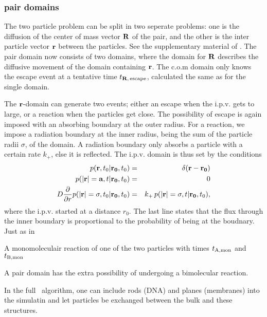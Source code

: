 \subsubsection{pair domains}
The two particle problem can be split in two seperate problems: one is the diffusion of the center of mass vector ${\bf R}$ of the pair, and the other is the inter particle vector ${\bf r}$ between the particles. See the supplementary material of \cite{Takahashi2010}. The pair domain now consists of two domains, where the domain for ${\bf R}$ describes the diffusive movement of the domain containing ${\bf r}$. The c.o.m domain only knows the escape event at a tentative time $t_{{\bf R},\,{\rm escape}}$, calculated the same as for the single domain. 

The ${\bf r}$-domain can generate two events; either an escape when the i.p.v. gets to large, or a reaction when the particles get close. The possibility of escape is again imposed with an absorbing boundary at the outer radius. For a reaction, we impose a radiation boundary at the inner radius, being the sum of the particle radii $\sigma$, of the domain. A radiation boundary only absorbs a particle with a certain rate $k_+$, else it is reflected. The i.p.v. domain is thus set by the conditions
\setlength{\jot}{10pt}
\begin{eqnarray}
 p({\bf r}, t_0|{\bf r_0},t_0) & = & \delta(\mathbf{r - r_0}) \\
 p({\bf |r|=a}, t|{\bf r_0},t_0) & = & 0 \\
 D \frac{\partial }{\partial r} p({\bf |r|}=\sigma, t_0|{\bf r_0},t_0) & = & k_+\,p({\bf |r|}=\sigma, t|{\bf r_0},t_0),
\end{eqnarray}
where the i.p.v. started at a distance $r_0$. The last line states that the flux through the inner boundary is proportional to the probability of being at the boudnary. Just as in 





A monomoleculair reaction of one of the two particles with times $t_{\rm A, mon}$ and $t_{\rm B, mon}$


A pair domain has the extra possibility of undergoing a bimolecular reaction.



In the full \GFRD\ algorithm, one can include rods (DNA) and planes (membranes) into the simulatin and let particles be exchanged between the bulk and these structures.









